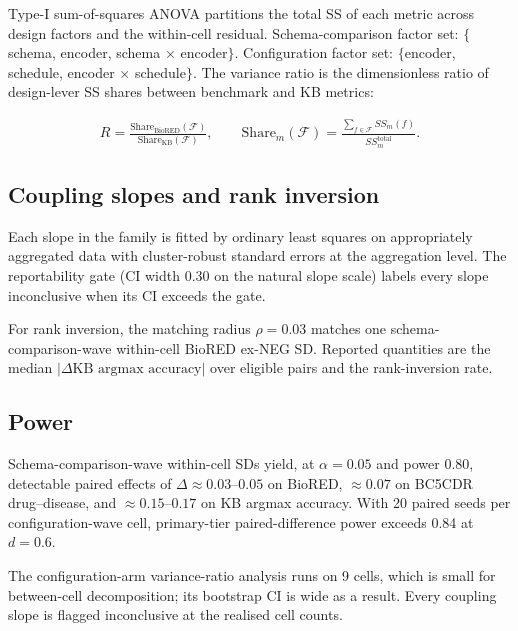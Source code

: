 Type-I sum-of-squares ANOVA partitions the total SS of each metric
across design factors and the within-cell residual. Schema-comparison
factor set: $\{$schema, encoder, schema $\times$ encoder$\}$.
Configuration factor set: $\{$encoder, schedule, encoder $\times$
schedule$\}$. The variance ratio is the dimensionless ratio of
design-lever SS shares between benchmark and KB metrics:

\begin{align*}
R = \frac{\text{Share}_{\text{BioRED}}(\mathcal{F})}
         {\text{Share}_{\text{KB}}(\mathcal{F})}, \qquad
\text{Share}_m(\mathcal{F}) =
\frac{\sum_{f\in\mathcal{F}} SS_m(f)}{SS_m^{\text{total}}}.
\end{align*}

\subsection{Coupling slopes and rank inversion}

Each slope in the family is fitted by ordinary least squares on
appropriately aggregated data with cluster-robust standard errors at
the aggregation level. The reportability gate (CI width 0.30 on the
natural slope scale) labels every slope inconclusive when its CI
exceeds the gate.

For rank inversion, the matching radius $\rho = 0.03$ matches
one schema-comparison-wave within-cell BioRED ex-NEG SD. Reported
quantities are the median $|\Delta\text{KB argmax accuracy}|$ over
eligible pairs and the rank-inversion rate.

\subsection{Power}

Schema-comparison-wave within-cell SDs yield, at $\alpha = 0.05$ and
power 0.80, detectable paired effects of $\Delta \approx 0.03$--$0.05$
on BioRED, $\approx 0.07$ on BC5CDR drug--disease, and
$\approx 0.15$--$0.17$ on KB argmax accuracy. With 20 paired seeds
per configuration-wave cell, primary-tier paired-difference power
exceeds 0.84 at $d = 0.6$.

The configuration-arm variance-ratio analysis runs on 9 cells, which
is small for between-cell decomposition; its bootstrap CI is wide as
a result. Every coupling slope is flagged inconclusive at the
realised cell counts.